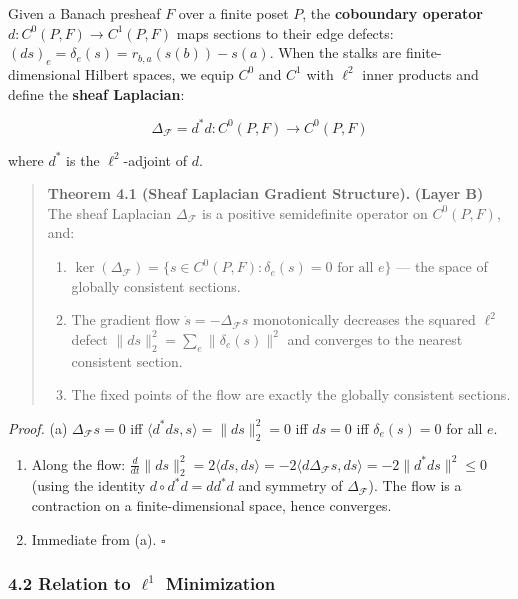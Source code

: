 \documentclass[
]{article}
\begin{document}
Given a Banach presheaf \(F\) over a finite poset \(P\), the
\textbf{coboundary operator} \(d: C^0(P, F) \to C^1(P, F)\) maps
sections to their edge defects:
\((ds)_e = \delta_e(s) = r_{b,a}(s(b)) - s(a)\). When the stalks are
finite-dimensional Hilbert spaces, we equip \(C^0\) and \(C^1\) with
\(\ell^2\) inner products and define the \textbf{sheaf Laplacian}:

\[\Delta_\mathcal{F} = d^* d : C^0(P, F) \to C^0(P, F)\]

where \(d^*\) is the \(\ell^2\)-adjoint of \(d\).

\begin{quote}
\textbf{Theorem 4.1 (Sheaf Laplacian Gradient Structure).}
\textbf{(Layer B)} The sheaf Laplacian \(\Delta_\mathcal{F}\) is a
positive semidefinite operator on \(C^0(P, F)\), and:

\begin{enumerate}
\def\labelenumi{(\alph{enumi})}
\item
  \(\ker(\Delta_\mathcal{F}) = \{s \in C^0(P, F) : \delta_e(s) = 0 \text{ for all } e\}\)
  --- the space of globally consistent sections.
\item
  The gradient flow \(\dot{s} = -\Delta_\mathcal{F} s\) monotonically
  decreases the squared \(\ell^2\) defect
  \(\|ds\|_2^2 = \sum_e \|\delta_e(s)\|^2\) and converges to the nearest
  consistent section.
\item
  The fixed points of the flow are exactly the globally consistent
  sections.
\end{enumerate}
\end{quote}

\emph{Proof.} (a) \(\Delta_\mathcal{F} s = 0\) iff
\(\langle d^*ds, s \rangle = \|ds\|_2^2 = 0\) iff \(ds = 0\) iff
\(\delta_e(s) = 0\) for all \(e\).

\begin{enumerate}
\def\labelenumi{(\alph{enumi})}
\setcounter{enumi}{1}
\item
  Along the flow:
  \(\frac{d}{dt}\|ds\|_2^2 = 2\langle d\dot{s}, ds \rangle = -2\langle d\Delta_\mathcal{F} s, ds \rangle = -2\|d^*ds\|^2 \leq 0\)
  (using the identity \(d \circ d^* d = d d^* d\) and symmetry of
  \(\Delta_\mathcal{F}\)). The flow is a contraction on a
  finite-dimensional space, hence converges.
\item
  Immediate from (a). \(\square\)
\end{enumerate}

\subsubsection{\texorpdfstring{4.2 Relation to \(\ell^1\)
Minimization}{4.2 Relation to \textbackslash ell\^{}1 Minimization}}\label{relation-to-ell1-minimization}
\end{document}
